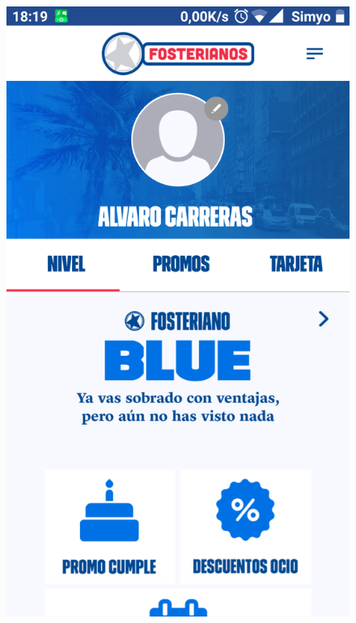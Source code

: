 \documentclass[twoside]{report}
\begin{document}
\begin{figure}[H]
\begin{center}
\includegraphics[scale=0.25]{images/restaurantes/foster0.png}

\end{center}
\end{figure}
\end{document}
